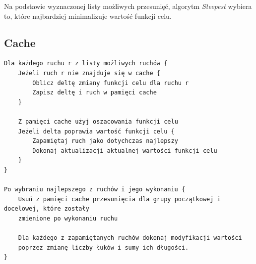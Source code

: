 \documentclass[main.tex]{subfiles}
\begin{document}
Na podstawie wyznaczonej listy możliwych przesunięć, algorytm \textit{Steepest} wybiera to, które najbardziej minimalizuje wartość funkcji celu.

\subsection{Cache}
\begin{verbatim}
Dla każdego ruchu r z listy możliwych ruchów {
    Jeżeli ruch r nie znajduje się w cache {
        Oblicz deltę zmiany funkcji celu dla ruchu r
        Zapisz deltę i ruch w pamięci cache
    }

    Z pamięci cache użyj oszacowania funkcji celu
    Jeżeli delta poprawia wartość funkcji celu {
        Zapamiętaj ruch jako dotychczas najlepszy
        Dokonaj aktualizacji aktualnej wartości funkcji celu
    }
}

Po wybraniu najlepszego z ruchów i jego wykonaniu {
    Usuń z pamięci cache przesunięcia dla grupy początkowej i docelowej, które zostały
    zmienione po wykonaniu ruchu

    Dla każdego z zapamiętanych ruchów dokonaj modyfikacji wartości
    poprzez zmianę liczby łuków i sumy ich długości.
}
\end{verbatim}
\end{document}
